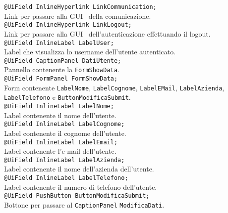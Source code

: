 {\begin{sloppypar}
{{\begin{itemize}
				\texttt{@UiField InlineHyperlink LinkCommunication;}\\
				Link per passare alla GUI\g~ della comunicazione.\\
				
				\texttt{@UiField InlineHyperlink LinkLogout;}\\
				Link per passare alla GUI\g~ dell'autenticazione effettuando il logout.\\
				
				\texttt{@UiField InlineLabel LabelUser;}\\
				Label che visualizza lo username dell'utente autenticato.\\
				
				\texttt{@UiField CaptionPanel DatiUtente;}\\
				Pannello contenente la \texttt{FormShowData}.\\
				
				\texttt{@UiField FormPanel FormShowData;}\\
				Form contenente \texttt{LabelNome}, \texttt{LabelCognome}, \texttt{LabelEMail}, \texttt{LabelAzienda}, \texttt{LabelTelefono} e \texttt{ButtonModificaSubmit}.\\

				\texttt{@UiField InlineLabel LabelNome;}\\
				Label contenente il nome dell'utente.\\
				
				\texttt{@UiField InlineLabel LabelCognome;}\\
				Label contenente il cognome dell'utente.\\
				
				\texttt{@UiField InlineLabel LabelEmail;}\\
				Label contenente l'e-mail dell'utente.\\
				
				\texttt{@UiField InlineLabel LabelAzienda;}\\
				Label contenente il nome dell'azienda dell'utente.\\
				
				\texttt{@UiField InlineLabel LabelTelefono;}\\
				Label contenente il numero di telefono dell'utente.\\

				\texttt{@UiField PushButton ButtonModificaSubmit;}\\
				Bottone per passare al \texttt{CaptionPanel} \texttt{ModificaDati}.\\


\end{itemize}}}
\end{sloppypar}}
